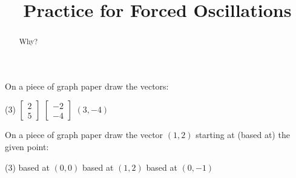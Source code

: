 \documentclass{ximera}
\title{Practice for Forced Oscillations}
\begin{document}
\begin{abstract}
Why?
\end{abstract}
\maketitle


\begin{exercise}
    On a piece of graph paper draw the vectors:
    \begin{tasks}(3)
        \task
        $\begin{bmatrix}
            2 \\
            5 
        \end{bmatrix}$
        \task
        $\begin{bmatrix}
            -2 \\
            -4
        \end{bmatrix}$
        \task $(3,-4)$
    \end{tasks}
\end{exercise}

\begin{exercise}
    On a piece of graph paper draw the vector $(1,2)$ starting at (based at) the given point:
    \begin{tasks}(3)
        \task based at $(0,0)$
        \task based at $(1,2)$
        \task based at $(0,-1)$
    \end{tasks}
\end{exercise}
\end{document}
